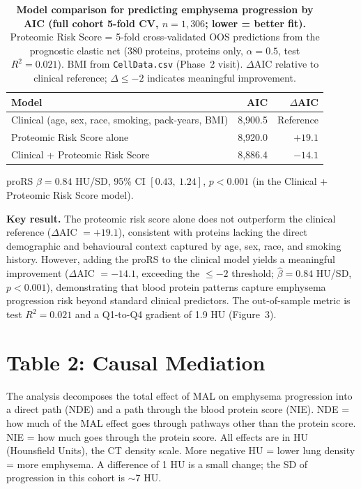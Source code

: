\documentclass[11pt, letterpaper]{article}
\begin{document}
\begin{table}[H]
\centering
\caption*{\textbf{Model comparison for predicting emphysema progression
  by AIC (full cohort 5-fold CV, $n = 1{,}306$; lower = better fit).}
  Proteomic Risk Score = 5-fold cross-validated OOS predictions from
  the prognostic elastic net (380 proteins, proteins only, $\alpha = 0.5$,
  test $R^2 = 0.021$). BMI from \texttt{CellData.csv} (Phase~2 visit).
  $\Delta$AIC relative to clinical reference; $\Delta \leq -2$
  indicates meaningful improvement.}
\begin{tabular}{lrr}
\toprule
Model & AIC & $\Delta$AIC \\
\midrule
Clinical (age, sex, race, smoking, pack-years, BMI) & 8{,}900.5 & Reference \\
Proteomic Risk Score alone                           & 8{,}920.0 & $+19.1$ \\
Clinical + Proteomic Risk Score                      & 8{,}886.4 & $-14.1$ \\
\bottomrule
\end{tabular}
\end{table}

\noindent proRS $\hat\beta = 0.84$ HU/SD, 95\% CI $[0.43,\ 1.24]$,
$p < 0.001$ (in the Clinical + Proteomic Risk Score model).

\textbf{Key result.} The proteomic risk score alone does not outperform
the clinical reference ($\Delta$AIC $= +19.1$), consistent with proteins
lacking the direct demographic and behavioural context captured by age,
sex, race, and smoking history. However, adding the proRS to the clinical
model yields a meaningful improvement ($\Delta$AIC $= -14.1$, exceeding
the $\leq -2$ threshold; $\hat\beta = 0.84$ HU/SD, $p < 0.001$),
demonstrating that blood protein patterns capture emphysema progression
risk beyond standard clinical predictors. The out-of-sample metric is
test $R^2 = 0.021$ and a Q1-to-Q4 gradient of 1.9 HU (Figure~3).

\section*{Table 2: Causal Mediation}

The analysis decomposes the total effect of MAL on emphysema progression
into a direct path (NDE) and a path through the blood protein score
(NIE). NDE = how much of the MAL effect goes through pathways other than
the protein score. NIE = how much goes through the protein score.
All effects are in HU (Hounsfield Units), the CT density scale. More
negative HU = lower lung density = more emphysema. A difference of 1 HU
is a small change; the SD of progression in this cohort is $\sim$7 HU.
\end{document}
